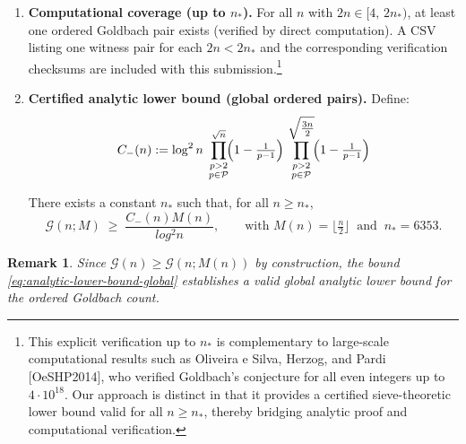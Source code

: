 \documentclass[11pt]{article}
\theoremstyle{inline}
\newtheorem*{remark}{Remark}
\theoremstyle{break}
\theoremstyle{break}
\theoremstyle{break}
\theoremstyle{break}
\theoremstyle{break}
\theoremstyle{inline}
\newcommand{\xMertens}{6353} %
\newcommand{\CminusProduct}{C_{-}}
\begin{document}
\begin{enumerate}
   \item \textbf{Computational coverage (up to \(n_\ast\)).}
   For all \(n\) with \(2n \in [4,\,2n_\ast)\), at least one ordered Goldbach pair exists
   (verified by direct computation). A CSV listing one witness pair for each \(2n<2n_\ast\) and the
   corresponding verification checksums are included with this submission.\footnote{This explicit verification up to \( n_\ast \) is complementary to large-scale computational results such as Oliveira e Silva, Herzog, and Pardi [OeSHP2014], who verified Goldbach’s conjecture for all even integers up to \( 4\cdot 10^{18} \). Our approach is distinct in that it provides a certified sieve-theoretic lower bound valid for all \( n \ge n_\ast \), thereby bridging analytic proof and computational verification.}

  \item \textbf{Certified analytic lower bound (global ordered pairs).}
  Define:
  \begin{equation}
    \CminusProduct(n) := \log^2{n} \;
      \prod_{\substack{p>2\\ p\in\mathcal{P}}}^{\sqrt{n}}
        \!\Bigl(1-\tfrac{1}{p-1}\Bigr)\,
      \prod_{\substack{p>2\\ p\in\mathcal{P}}}^{\sqrt{\tfrac{3n}{2}}}
        \!\Bigl(1-\tfrac{1}{p-1}\Bigr)
     \label{eq:cminus-product-definition}
   \end{equation}

  There exists a constant \( n_\ast \) such that, for all \(n \ge n_\ast\),
  \begin{equation}
    \mathcal{G}(n;M)\;\ge\;\frac{\CminusProduct(n)M(n)}{log^2 n},
    \qquad
    \text{with } M(n)=\bigl\lfloor \tfrac{n}{2} \bigr\rfloor
    \ \text{ and }\
    n_\ast=\xMertens .
    \label{eq:analytic-lower-bound-global}
  \end{equation}
\end{enumerate}

\begin{remark}
Since \(\mathcal{G}(n) \ge \mathcal{G}(n;M(n))\) by construction, the bound
\eqref{eq:analytic-lower-bound-global} establishes a valid global
analytic lower bound for the ordered Goldbach count.
\end{remark}
\end{document}
